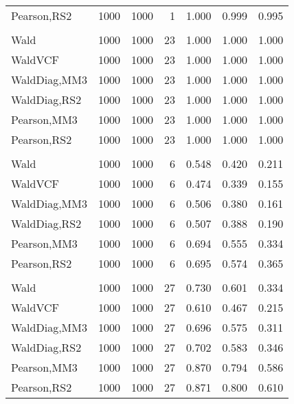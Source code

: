 \documentclass[
]{article}
\begin{document}
\begin{table}[H]
{\begin{tabular}[t]{lrrrrrr}
\hspace{1em}Pearson,RS2 & 1000 & 1000 & 1 & 1.000 & 0.999 & 0.995\\
\addlinespace[0.3em]
\multicolumn{7}{l}{\textbf{1F 15V}}\\
\hspace{1em}Wald & 1000 & 1000 & 23 & 1.000 & 1.000 & 1.000\\
\hspace{1em}WaldVCF & 1000 & 1000 & 23 & 1.000 & 1.000 & 1.000\\
\hspace{1em}WaldDiag,MM3 & 1000 & 1000 & 23 & 1.000 & 1.000 & 1.000\\
\hspace{1em}WaldDiag,RS2 & 1000 & 1000 & 23 & 1.000 & 1.000 & 1.000\\
\hspace{1em}Pearson,MM3 & 1000 & 1000 & 23 & 1.000 & 1.000 & 1.000\\
\hspace{1em}Pearson,RS2 & 1000 & 1000 & 23 & 1.000 & 1.000 & 1.000\\
\addlinespace[0.3em]
\multicolumn{7}{l}{\textbf{2F 10V}}\\
\hspace{1em}Wald & 1000 & 1000 & 6 & 0.548 & 0.420 & 0.211\\
\hspace{1em}WaldVCF & 1000 & 1000 & 6 & 0.474 & 0.339 & 0.155\\
\hspace{1em}WaldDiag,MM3 & 1000 & 1000 & 6 & 0.506 & 0.380 & 0.161\\
\hspace{1em}WaldDiag,RS2 & 1000 & 1000 & 6 & 0.507 & 0.388 & 0.190\\
\hspace{1em}Pearson,MM3 & 1000 & 1000 & 6 & 0.694 & 0.555 & 0.334\\
\hspace{1em}Pearson,RS2 & 1000 & 1000 & 6 & 0.695 & 0.574 & 0.365\\
\addlinespace[0.3em]
\multicolumn{7}{l}{\textbf{3F 15V}}\\
\hspace{1em}Wald & 1000 & 1000 & 27 & 0.730 & 0.601 & 0.334\\
\hspace{1em}WaldVCF & 1000 & 1000 & 27 & 0.610 & 0.467 & 0.215\\
\hspace{1em}WaldDiag,MM3 & 1000 & 1000 & 27 & 0.696 & 0.575 & 0.311\\
\hspace{1em}WaldDiag,RS2 & 1000 & 1000 & 27 & 0.702 & 0.583 & 0.346\\
\hspace{1em}Pearson,MM3 & 1000 & 1000 & 27 & 0.870 & 0.794 & 0.586\\
\hspace{1em}Pearson,RS2 & 1000 & 1000 & 27 & 0.871 & 0.800 & 0.610\\
\bottomrule
\end{tabular}}
\endgroup{}
\end{table}
\end{document}
